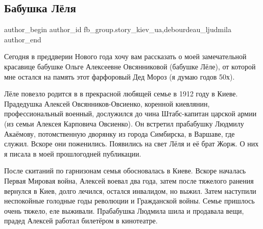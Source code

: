  
 
 
 
 
 
\subsection{Бабушка Лёля}
\label{sec:28_12_2021.fb.fb_group.story_kiev_ua.1.babushka_lelja}
 
\ifcmt
 author_begin
   author_id fb_group.story_kiev_ua,debourdeau_ljudmila
 author_end
\fi

Сегодня в преддверии Нового года хочу вам рассказать о моей замечательной
красавице бабушке Ольге Алексеевне Овсянниковой (бабушке Лёле), от которой мне
остался на память этот фарфоровый Дед Мороз (я думаю годов 50х). 

Лёле повезло родится в в прекрасной любящей семье в 1912 году в Киеве.
Прадедушка Алексей Овсянников-Овсиенко, коренной киевлянин, профессиональный
военный, дослужился до чина Штабс-капитан царской армии (из семьи Алексея
Карповича Овсиенко). Он встретил прабабушку Людмилу Акаёмову, потомственную
дворянку из города Симбирска, в Варшаве, где служил. Вскоре они поженились.
Появились на свет Лёля и её брат Жорж. О них я писала в моей прошлогодней
публикации. 

\raggedcolumns
\begin{multicols}{2} %
\setlength{\parindent}{0pt}


\end{multicols} %

После скитаний по гарнизонам семья обосновалась в Киеве. Вскоре началась Первая
Мировая война, Алексей воевал два года, затем после тяжелого ранения вернулся в
Киев, долго лечился, остался инвалидом, но выжил. Затем наступили неспокойные
голодные годы революции и Гражданской войны. Семье пришлось очень тяжело, еле
выживали. Прабабушка Людмила шила и продавала вещи, прадед Алексей работал
билетёром в кинотеатре.


